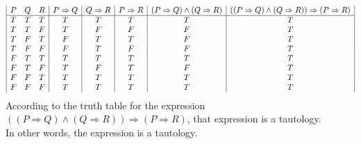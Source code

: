 \documentclass[11pt]{article}
\begin{document}
\begin{displaymath}
\begin{array}{|c c c | c | c | c | c |c|}
P & Q & R & P \Rightarrow Q & Q \Rightarrow R & P \Rightarrow R & (P \Rightarrow Q) \land (Q \Rightarrow R) & ((P \Rightarrow Q) \land (Q \Rightarrow R)) \Rightarrow (P \Rightarrow R)\\ 
\hline
T & T & T & T & T & T & T & T\\
T & T & F & T & F & F & F & T\\
T & F & T & F & T & T & F & T\\
T & F & F & F & T & F & F & T\\
F & T & T & T & T & T & T & T\\
F & T & F & T & F & T & F & T\\
F & F & T & T & T & T & T & T\\
F & F & F & T & T & T & T & T\\

\end{array}
\end{displaymath}
According to the truth table for the expression $((P \Rightarrow Q) \land (Q \Rightarrow R)) \Rightarrow (P \Rightarrow R)$, that expression is a tautology.\\
In other words, the expression  is a tautology.

\newpage
\end{document}
